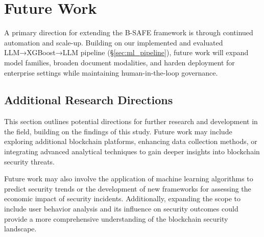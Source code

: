 \section{Future Work}
\label{sec:future_work}

A primary direction for extending the B-SAFE framework is through continued automation and scale-up. Building on our implemented and evaluated LLM→XGBoost→LLM pipeline (\S\ref{sec:ml_pipeline}), future work will expand model families, broaden document modalities, and harden deployment for enterprise settings while maintaining human-in-the-loop governance.



\subsection{Additional Research Directions}
This section outlines potential directions for further research and development in the field, building on the findings of this study. Future work may include exploring additional blockchain platforms, enhancing data collection methods, or integrating advanced analytical techniques to gain deeper insights into blockchain security threats.

Future work may also involve the application of machine learning algorithms to predict security trends or the development of new frameworks for assessing the economic impact of security incidents. Additionally, expanding the scope to include user behavior analysis and its influence on security outcomes could provide a more comprehensive understanding of the blockchain security landscape.